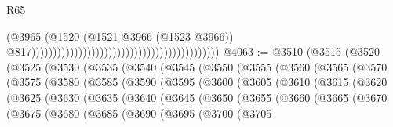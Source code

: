 \begin{lexlean}{R65}
\begin{coremodule}
{                                                                                        (@3965
                                                                                          (@1520
                                                                                            (@1521
                                                                                              @3966
                                                                                              (@1523
                                                                                                @3966))
                                                                                            @817))))))))))))))))))))))))))))))))))))))))))))
@4063 := @3510
    (@3515
      (@3520
        (@3525
          (@3530
            (@3535
              (@3540
                (@3545
                  (@3550
                    (@3555
                      (@3560
                        (@3565
                          (@3570
                            (@3575
                              (@3580
                                (@3585
                                  (@3590
                                    (@3595
                                      (@3600
                                        (@3605
                                          (@3610
                                            (@3615
                                              (@3620
                                                (@3625
                                                  (@3630
                                                    (@3635
                                                      (@3640
                                                        (@3645
                                                          (@3650
                                                            (@3655
                                                              (@3660
                                                                (@3665
                                                                  (@3670
                                                                    (@3675
                                                                      (@3680
                                                                        (@3685
                                                                          (@3690
                                                                            (@3695
                                                                              (@3700
                                                                                (@3705
}
\end{coremodule}
\end{lexlean}
